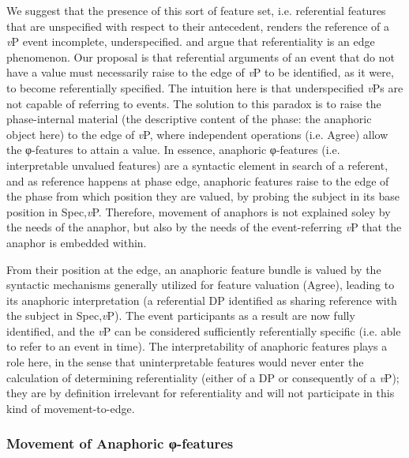 \documentclass[output=paper
,modfonts
,nonflat
]{langsci/langscibook}
\begin{document}
We suggest that the presence of this sort of feature set, i.e. referential features that are unspecified with respect to their antecedent, renders the reference of a \textit{v}P event incomplete, underspecified. \citet{Hinzen:2012} and \citet{SheehanHinzen:2011} argue that referentiality is an edge phenomenon. Our proposal is that referential arguments of an event that do not have a value must necessarily raise to the edge of \textit{v}P to be identified, as it were, to become referentially specified. The intuition here is that underspecified \textit{v}Ps are not capable of referring to events. The solution to this paradox is to raise the phase-internal material (the descriptive content of the phase: the anaphoric object here) to the edge of \textit{v}P, where independent operations (i.e. Agree) allow the φ-features to attain a value. In essence, anaphoric φ-features (i.e. interpretable unvalued features) are a syntactic element in search of a referent, and as reference happens at phase edge, anaphoric features raise to the edge of the phase from which position they are valued, by probing the subject in its base position in Spec,\textit{v}P. Therefore, movement of anaphors is not explained soley by the needs of the anaphor, but also by the needs of the event-referring \textit{v}P that the anaphor is embedded within.

From their position at the edge, an anaphoric feature bundle is valued by the syntactic mechanisms generally utilized for feature valuation (Agree), leading to its anaphoric interpretation (a referential DP identified as sharing reference with the subject in Spec,\textit{v}P). The event participants as a result are now fully identified, and the \textit{v}P can be considered sufficiently referentially specific (i.e. able to refer to an event in time). The interpretability of anaphoric features plays a role here, in the sense that uninterpretable features would never enter the calculation of determining referentiality (either of a DP or consequently of a \textit{v}P); they are by definition irrelevant for referentiality and will not participate in this kind of movement-to-edge.

\subsubsection{Movement of Anaphoric φ-features}
\end{document}
